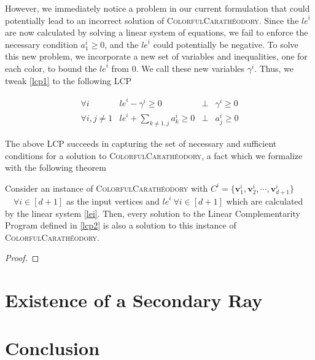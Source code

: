 \documentclass[a4paper,11pt]{article}
\def\problem#1{\textsc{#1}}
\def\v{\textbf{v}}
\def\CCP{\problem{ColorfulCarath\'eodory}\xspace}
\begin{document}
\par However, we immediately notice a problem in our current formulation that could potentially lead to an
incorrect solution of \CCP. Since the ${le}^i$ are now calculated by solving a linear system of equations,
we fail to enforce the necessary condition $a^i_1 \geq 0$, and the ${le}^i$ could potentially be negative.
To solve this new problem, we incorporate a new set of variables and inequalities, one for each color, to
bound the ${le}^i$ from $0$. We call these new variables $\gamma^i$. Thus, we tweak \eqref{lcp1} to the
following LCP

\begin{equation}\label{lcp2}
\begin{array}{lccl}
\forall i & {le}^i - \gamma^i \geq 0 & \bot & \gamma^i \geq 0 \\
\forall i, j \neq 1 & {le}^i + \sum_{k \neq 1, j} {a^i_k} \geq 0 & \bot & a^i_j \geq 0
\end{array}
\end{equation}

\par The above LCP succeeds in capturing the set of necessary and sufficient conditions for a solution to \CCP,
a fact which we formalize with the following theorem

\begin{theorem}
Consider an instance of \CCP with $C^i = ${\normalfont$\{ \v^i_1, \v^i_2, \cdots, \v^i_{d+1} \}$}
$\quad \forall i \in [d+1]$ as the input vertices and ${le}^i \: \forall i \in [d+1]$ which are calculated by
the linear system \eqref{lei}. Then, every solution to the Linear Complementarity Program defined in \eqref{lcp2}
is also a solution to this instance of \CCP.
\end{theorem}

\begin{proof}
\end{proof}



\section{Existence of a Secondary Ray}


\section{Conclusion}




\end{document}
